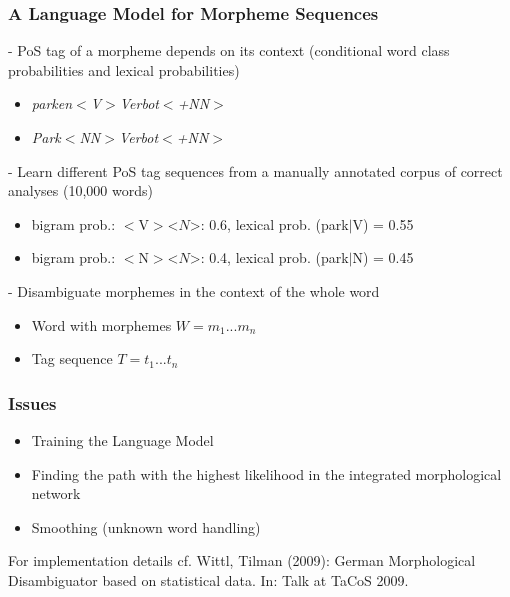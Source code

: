 \documentclass {beamer}
\begin{document}
 
 \frame
{  \frametitle{A Language Model for Morpheme Sequences}
- PoS tag of a morpheme depends on its context (conditional word class probabilities and lexical probabilities)\\
  \begin{itemize} 
  \item \textit{parken$<$V$>$Verbot$<$+NN$>$}  \\
  \item \textit{Park$<$NN$>$Verbot$<$+NN$>$}  \\
  \end{itemize}
- Learn different PoS tag sequences from a manually annotated corpus of correct analyses (10,000 words)\\
 \begin{itemize}
\item  bigram prob.: $<$V$>$<$N$>: 0.6, lexical prob. (park$|$V) = 0.55
\item  bigram prob.: $<$N$>$<$N$>: 0.4, lexical prob. (park$|$N) = 0.45
\end{itemize}
- Disambiguate morphemes in the context of the whole word\\
  \begin{itemize}
  \item Word with morphemes \begin{math} W = m_{1} ... m_{n} \end{math}
  \item Tag sequence \begin{math} T = t_{1} ... t_{n} \end{math}
    \end{itemize}
 }

\frame
{  \frametitle{Issues}
\begin{itemize} 
\item Training the Language Model
\item Finding the path with the highest likelihood in the integrated morphological network
\item Smoothing (unknown word handling)
\end{itemize}
For implementation details cf. Wittl, Tilman (2009): German Morphological Disambiguator based on statistical data. In: Talk at TaCoS 2009.
}
\end{document}
